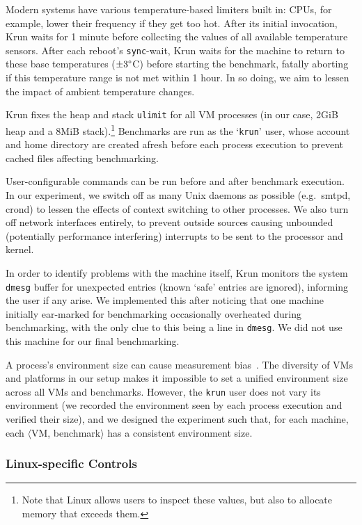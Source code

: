 \documentclass[acmsmall]{acmart}\settopmatter{printfolios=true}
\newcommand{\krun}{Krun\xspace}
\newcommand{\vmbpair}{$\langle$VM, benchmark$\rangle$\xspace}
\begin{document}
Modern systems have various temperature-based limiters built in:
CPUs, for example, lower their frequency if they get too hot.
After its initial invocation, \krun waits for 1 minute before collecting
the values of all available temperature sensors. After each reboot's \texttt{sync}-wait, \krun waits
for the machine to return to these base temperatures ($\pm3\degree$C) before
starting the benchmark, fatally aborting if this temperature range is not
met within 1 hour. In so doing, we aim to lessen the impact of ambient temperature changes.

\krun fixes the heap and stack \texttt{ulimit} for all VM processes
(in our case, 2GiB heap and a 8MiB stack).\footnote{Note that Linux allows users
to inspect these values, but also to allocate memory that exceeds them.} Benchmarks are run
as the `\texttt{krun}' user, whose account and home directory are created
afresh before each process execution to prevent cached files affecting benchmarking.

User-configurable commands can be run before and after benchmark execution. In
our experiment, we switch off as many Unix daemons as possible (e.g.~smtpd,
crond) to lessen the effects of context switching to other processes. We also
turn off network interfaces entirely, to prevent outside sources causing unbounded
(potentially performance interfering) interrupts to be sent to the processor and kernel.

In order to identify problems with the machine itself, \krun monitors the
system \texttt{dmesg} buffer for unexpected entries (known `safe' entries
are ignored), informing the user if any arise. We implemented this after
noticing that one machine initially ear-marked for benchmarking occasionally
overheated during benchmarking, with the only clue to this being a line in \texttt{dmesg}.
We did not use this machine for our final benchmarking.

A process's environment size can cause measurement
bias~\cite{mytkowicz09surprising}. The diversity of VMs and platforms
in our setup makes it impossible to set a unified environment size across all VMs and
benchmarks. However, the \texttt{krun} user does not
vary its environment (we recorded the environment seen by each process
execution and verified their size), and we designed the experiment such that,
for each machine, each \vmbpair has a consistent environment size.


\subsubsection{Linux-specific Controls}
\end{document}
